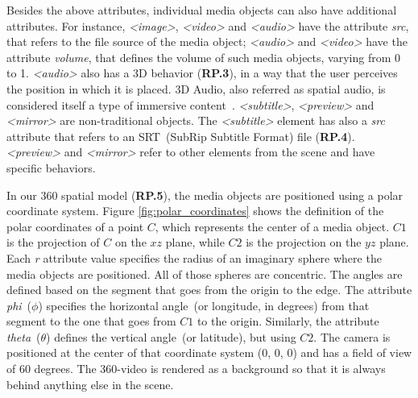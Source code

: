Besides the above attributes, individual media objects can also have additional attributes. For instance, \emph{<image>}, \emph{<video>} and \emph{<audio>} have the attribute \emph{src}, that refers to the file source of the media object; \emph{<audio>} and \emph{<video>} have the attribute \emph{volume}, that defines the volume of such media objects, varying from 0 to 1. \textit{<audio>} also has a 3D behavior (\textbf{RP.3}), in a way that the user perceives the position in which it is placed. 3D Audio, also referred as spatial audio, is considered itself a type of immersive content~\cite{hughes_disruptive_2019}. \emph{<subtitle>}, \emph{<preview>} and \emph{<mirror>} are non-traditional objects. The \emph{<subtitle>} element has also a \emph{src} attribute that refers to an SRT~(SubRip Subtitle Format) file (\textbf{RP.4}). \emph{<preview>} and \emph{<mirror>} refer to other elements from the scene and have specific behaviors.

In our 360 spatial model (\textbf{RP.5}), the media objects are positioned using a polar coordinate system. Figure \ref{fig:polar_coordinates} shows the definition of the polar coordinates of a point $C$, which represents the center of a media object. $C1$ is the projection of $C$ on the $xz$ plane, while $C2$ is the projection on the $yz$ plane. Each \emph{r} attribute value specifies the radius of an imaginary sphere where the media objects are positioned. All of those spheres are concentric. The angles are defined based on the segment that goes from the origin to the edge. The attribute \emph{phi}~($\phi$) specifies the horizontal angle~(or longitude, in degrees) from that segment to the one that goes from $C1$ to the origin. Similarly, the attribute \emph{theta}~($\theta$) defines the vertical angle~(or latitude), but using $C2$.  The camera is positioned at the center of that coordinate system ($0$, $0$, $0$) and has a field of view of 60 degrees. The 360-video is rendered as a background so that it is always behind anything else in the scene.

